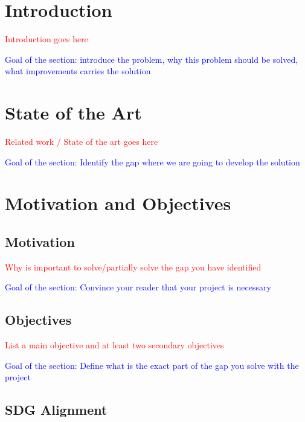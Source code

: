 \documentclass[12pt]{extarticle}
\numberwithin{equation}{section}
\begin{document}
\begin{refsection}

\section{Introduction}
\textcolor{red}{Introduction goes here}

\textcolor{blue}{Goal of the section: introduce the problem, why this problem should be solved, what improvements carries the solution}

\newpage

\section{State of the Art}\label{sec:related} 
\textcolor{red}{Related work / State of the art goes here}

\textcolor{blue}{Goal of the section: Identify the gap where we are going to develop the solution}

\newpage

\section{Motivation and Objectives}

\subsection{Motivation}
\textcolor{red}{Why is important to solve/partially solve the gap you have identified}

\textcolor{blue}{Goal of the section: Convince your reader that your project is necessary}

\subsection{Objectives}
\textcolor{red}{List a main objective and at least two secondary objectives}

\textcolor{blue}{Goal of the section: Define what is the exact part of the gap you solve with the project}

\subsection{SDG Alignment}


\end{refsection}
\end{document}
